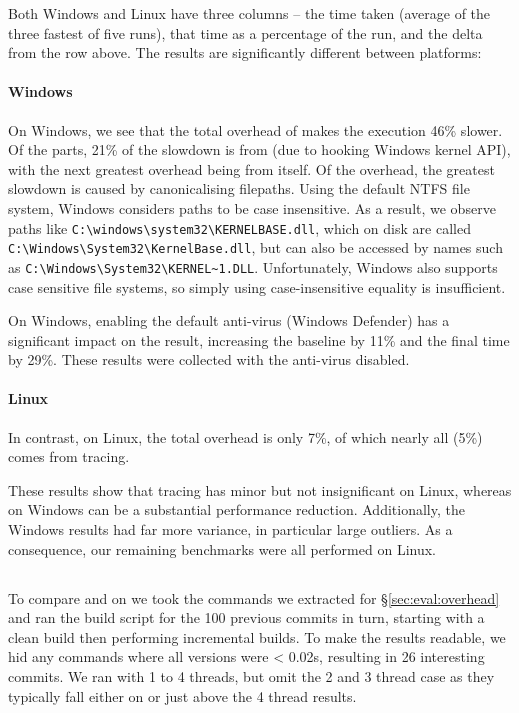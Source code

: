 Both Windows and Linux have three columns -- the time taken (average of the three fastest of five runs), that time as a percentage of the \Make run, and the delta from the row above. The results are significantly different between platforms:

\paragraph{Windows} On Windows, we see that the total overhead of \Rattle makes the execution 46\% slower. Of the parts, 21\% of the slowdown is from \Fsatrace (due to hooking Windows kernel API), with the next greatest overhead being from \Rattle itself. Of the \Rattle overhead, the greatest slowdown is caused by canonicalising filepaths. Using the default NTFS file system, Windows considers paths to be case insensitive. As a result, we observe paths like \verb"C:\windows\system32\KERNELBASE.dll", which on disk are called \verb"C:\Windows\System32\KernelBase.dll", but can also be accessed by names such as \verb"C:\Windows\System32\KERNEL~1.DLL". Unfortunately, Windows also supports case sensitive file systems, so simply using case-insensitive equality is insufficient.

On Windows, enabling the default anti-virus (Windows Defender) has a significant impact on the result, increasing the \Make baseline by 11\% and the final time by 29\%. These results were collected with the anti-virus disabled.

\paragraph{Linux} In contrast, on Linux, the total overhead is only 7\%, of which nearly all (5\%) comes from tracing.

\postparagraphs

These results show that tracing has minor but not insignificant on Linux, whereas on Windows can be a substantial performance reduction. Additionally, the Windows results had far more variance, in particular large outliers. As a consequence, our remaining benchmarks were all performed on Linux.

\subsection{\Fsatrace}
\label{sec:eval:fsatrace}

To compare \Make and \Rattle on \Fsatrace we took the commands we extracted for \S\ref{sec:eval:overhead} and ran the build script for the 100 previous commits in turn, starting with a clean build then performing incremental builds. To make the results readable, we hid any commands where all versions were < 0.02s, resulting in 26 interesting commits. We ran with 1 to 4 threads, but omit the 2 and 3 thread case as they typically fall either on or just above the 4 thread results.

